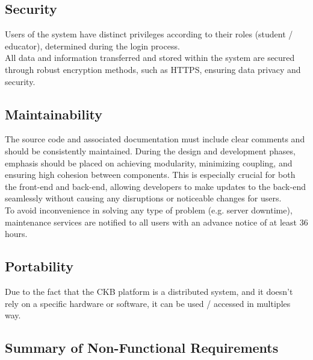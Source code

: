 \subsection{Security}
Users of the system have distinct privileges according to their roles (student / educator), determined during the login process.\\
All data and information transferred and stored within the system are secured through robust encryption methods, such as HTTPS, ensuring data privacy and security.\\

\subsection{Maintainability}
The source code and associated documentation must include clear comments and should be consistently maintained. During the design and development phases, emphasis should be placed on achieving modularity, minimizing coupling, and ensuring high cohesion between components.
This is especially crucial for both the front-end and back-end, allowing developers to make updates to the back-end seamlessly without causing any disruptions or noticeable changes for users.\\
To avoid inconvenience in solving any type of problem (e.g. server downtime), maintenance services are notified to all users with an advance notice of at least 36 hours.

\subsection{Portability}
Due to the fact that the CKB platform is a distributed system, and it doesn't rely on a specific hardware or software, it can be used / accessed in multiples way.\\

{\color{red}\subsection*{Summary of Non-Functional Requirements}}
